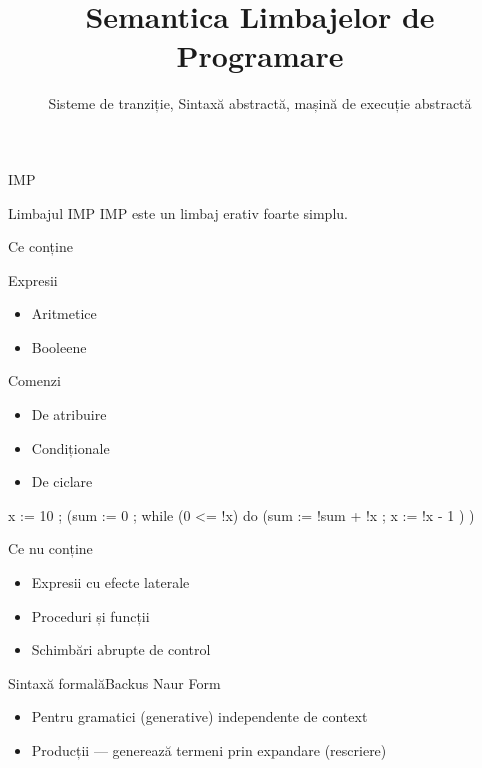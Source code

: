 \documentclass[handout,xcolor=pdftex,romanian,colorlinks]{beamer}
\title[SLP---Mașini Abstracte]{Semantica Limbajelor de Programare}
\subtitle{Sisteme de tranziție, Sintaxă abstractă, mașină de execuție abstractă}
\begin{document}
\maketitle


\begin{section}{IMP}
\begin{frame}[fragile]{Limbajul IMP}
IMP este un limbaj erativ foarte simplu.
\begin{block}{Ce conține}
\begin{minipage}{.49\columnwidth}
\begin{itemize}
\vitem Expresii
\begin{itemize}
  \item Aritmetice%
  \item Booleene%
\end{itemize}
\vitem Comenzi
\begin{itemize}
  \item De atribuire%
  \item Condiționale%
  \item De ciclare  %
\end{itemize}
\end{itemize}
\end{minipage}
\begin{minipage}{.49\columnwidth}
\begin{asciic}
 x := 10 ;
(sum := 0 ;
 while (0 <= !x)  do 
   (sum := !sum + !x ;
    x := !x - 1
   )
)
\end{asciic}
\end{minipage}
\end{block}
\begin{block}{Ce nu conține}
\begin{itemize}
\item Expresii cu efecte laterale
\item Proceduri și funcții
\item Schimbări abrupte de control
\end{itemize}
\end{block}
\end{frame}

 \begin{frame}{Sintaxă formală}{Backus Naur Form}
  \begin{itemize}
   \item Pentru gramatici (generative) independente de context
   \item Producții
       --- generează termeni prin expandare (rescriere)


\end{itemize}
\end{frame}
\end{section}
\end{document}
